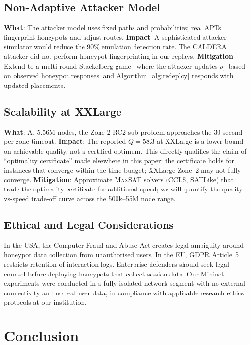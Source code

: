 \documentclass[journal]{IEEEtran}
\newcommand{\MAXSAT}{\textsc{MaxSAT}}
\begin{document}
\subsection{Non-Adaptive Attacker Model}
\textbf{What}: The attacker model uses fixed paths and
probabilities; real APTs fingerprint honeypots and adjust routes.
\textbf{Impact}: A sophisticated attacker simulator would reduce
the 90\% emulation detection rate. The CALDERA attacker did not
perform honeypot fingerprinting in our replays.
\textbf{Mitigation}: Extend to a multi-round Stackelberg
game~\cite{kiekintveld2015} where the attacker updates $\rho_\pi$
based on observed honeypot responses, and Algorithm~\ref{alg:redeploy}
responds with updated placements.

\subsection{Scalability at XXLarge}
\label{sec:limitations:scale}
\textbf{What}: At 5.56M nodes, the Zone-2 RC2 sub-problem
approaches the 30-second per-zone timeout.
\textbf{Impact}: The reported $Q=58.3$ at XXLarge is a lower bound
on achievable quality, not a certified optimum. This directly
qualifies the claim of ``optimality certificate'' made elsewhere in
this paper: the certificate holds for instances that converge within
the time budget; XXLarge Zone~2 may not fully converge.
\textbf{Mitigation}: Approximate \MAXSAT{} solvers (CCLS, SATLike)
that trade the optimality certificate for additional speed; we will
quantify the quality-vs-speed trade-off curve across the
500k--55M node range.

\subsection{Ethical and Legal Considerations}
In the USA, the Computer Fraud and Abuse Act creates legal ambiguity
around honeypot data collection from unauthorised users. In the EU,
GDPR Article~5 restricts retention of interaction logs. Enterprise
defenders should seek legal counsel before deploying honeypots that
collect session data. Our Mininet experiments were conducted in a
fully isolated network segment with no external connectivity and no
real user data, in compliance with applicable research ethics
protocols at our institution.

\section{Conclusion}
\label{sec:conclusion}
\end{document}
